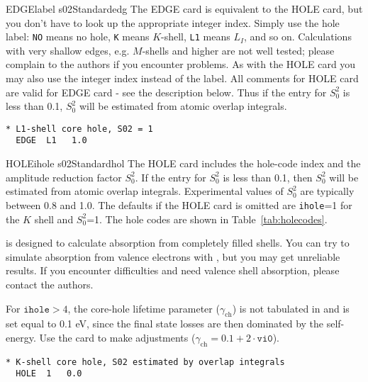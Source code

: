 \documentclass[11pt,oneside]{report} %
\begin{document}
\begin{Card}{EDGE}{label s02}{Standard}{edg}
  The EDGE card is equivalent to the HOLE card, but you don't have to
  look up the appropriate integer index. Simply use the hole label:
  \texttt{NO} means no hole, \texttt{K} means $K$-shell, \texttt{L1}
  means $L_{I}$, and so on. Calculations with very shallow edges,
  e.g. $M$-shells and higher are not well tested; please complain to the
  authors if you encounter problems.  As with the HOLE card you may also use
  the integer index instead of the label.  All comments for HOLE card
  are valid for EDGE card - see the description below. Thus if the
  entry for $S_0^2$ is less than 0.1, $S_0^2$ will be estimated from
  atomic overlap integrals.
\begin{verbatim}
* L1-shell core hole, S02 = 1
  EDGE  L1   1.0
\end{verbatim}
\end{Card}

\begin{Card}{HOLE}{ihole s02}{Standard}{hol}
  The HOLE card includes the hole-code index and the amplitude
  reduction factor $S_0^2$. If the entry for $S_0^2$ is less than 0.1,
  then $S_0^2$ will be estimated from atomic overlap
  integrals.  Experimental values of $S_0^2$ are typically
  between 0.8 and 1.0.  The defaults if the HOLE card is omitted are
  \texttt{ihole}=1 for the $K$ shell and $S_0^2$=1.  The hole codes
  are shown in Table~\ref{tab:holecodes}.

  {\feff} is designed to calculate absorption from completely filled
  shells.  You can try to simulate absorption from valence electrons
  with {\feff}, but you may get unreliable results. If you
  encounter difficulties and need valence shell absorption, please
  contact the authors.

  For $\texttt{ihole}>4$, the core-hole lifetime parameter
  ($\gamma_{\textrm{ch}}$) is not tabulated in {\feff} and is set
  equal to 0.1 eV, since the final state losses are then dominated by
  the self-energy. Use the  card to make
  adjustments ($\gamma_{\textrm{ch}} = 0.1 + 2\cdot\mathtt{vi0}$).

\begin{verbatim}
* K-shell core hole, S02 estimated by overlap integrals
  HOLE  1   0.0
\end{verbatim}
\end{Card}
\end{document}
